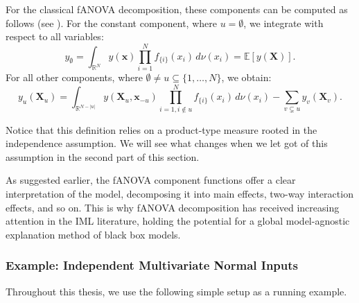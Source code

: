 For the classical fANOVA decomposition, these components can be computed as 
follows (see \cite{rahman2014}).
For the constant component, where $u = \emptyset$, we integrate with respect 
to all variables:
\begin{equation}
    y_{\emptyset} 
    = \int_{\mathbb{R}^N} 
        y(\boldsymbol{x}) 
        \prod_{i=1}^{N} f_{\{i\}}(x_i) 
        \, d\nu (x_i) 
    = \mathbb{E}[y(\boldsymbol{X})].
    \label{eq:intercept_classical}
\end{equation}
For all other components, where $\emptyset \neq u \subseteq \{1, \dots, N\}$, we obtain:
\begin{equation}
    y_u(\boldsymbol{X}_u) 
    = \int_{\mathbb{R}^{N- |u|}} 
        y(\boldsymbol{X}_u, \boldsymbol{x}_{-u}) 
        \prod_{i=1, i \notin u}^{N} f_{\{i\}}(x_i) 
        \, d\nu (x_i) 
      - \sum_{v \subsetneq u} y_v(\boldsymbol{X}_v).
    \label{eq:fanova_components_classical}
\end{equation}

Notice that this definition relies on a product-type measure rooted in the independence assumption. We will see what changes when we let got of this assumption in the second part of this section.\par
As suggested earlier, the fANOVA component functions offer a clear interpretation of the model, decomposing it into main effects, two-way interaction effects, and so on. This is why fANOVA decomposition has received increasing attention in the IML literature, holding the potential for a global model-agnostic explanation method of black box models.\par
\subsubsection{Example: Independent Multivariate Normal Inputs}

Throughout this thesis, we use the following simple setup as a running example.

